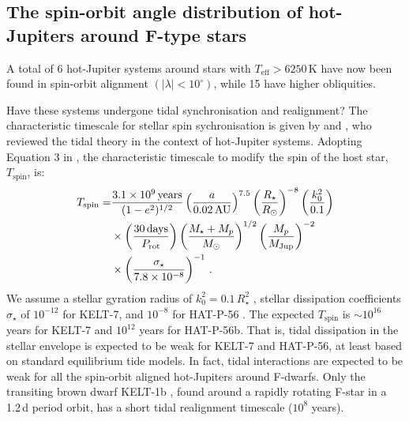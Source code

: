 \documentclass[useAMS,usenatbib]{mn2e}
\begin{document}
\subsection{The spin-orbit angle distribution of hot-Jupiters around F-type stars}
\label{sec:stats}

A total of 6 hot-Jupiter systems around stars with $T_\text{eff} > 6250\,\text{K}$ have now been found in spin-orbit alignment $(|\lambda| < 10^\circ)$, while 15 have higher obliquities.

Have these systems undergone tidal synchronisation and realignment? The characteristic timescale for stellar spin sychronisation is given by \citet{2010ApJ...723..285H} and \citet{2012ApJ...757....6H}, who reviewed the tidal theory in the context of hot-Jupiter systems. Adopting Equation 3 in \citet{2012ApJ...757....6H}, the characteristic timescale to modify the spin of the host star, $T_\text{spin}$, is:
\begin{align}
  T_\text{spin} =& \frac{3.1\times10^9\,\text{years}}{(1-e^2)^{1/2}} \left(\frac{a}{0.02 \,\text{AU}} \right)^{7.5} \left( \frac{R_\star}{R_\odot}\right)^{-8} \left( \frac{k_0^2}{0.1} \right) \notag\\
  &\times \left( \frac{30 \,\text{days}}{P_\text{rot}} \right) \left(\frac{M_\star + M_p}{M_\odot} \right)^{1/2} \left(\frac{M_p}{M_\text{Jup}} \right)^{-2} \notag\\
  &\times \left( \frac{\sigma_\star}{7.8\times10^{-8}} \right)^{-1}\,.
\end{align}
We assume a stellar gyration radius of $k_0^2=0.1\,R_\star ^2$ \citep{2000MNRAS.315..543H}, stellar dissipation coefficients $\sigma_\star$ of $10^{-12}$ for KELT-7, and $10^{-8}$ for  HAT-P-56 \citep[from Figure 3 of][]{2012ApJ...757....6H}. The expected $T_\text{spin}$ is $\sim 10^{16}$ years for KELT-7 and $10^{12}$ years for HAT-P-56b. That is, tidal dissipation in the stellar envelope is expected to be weak for KELT-7 and HAT-P-56, at least based on standard equilibrium tide models. In fact, tidal interactions are expected to be weak for all the spin-orbit aligned hot-Jupiters around F-dwarfs. Only the transiting brown dwarf KELT-1b \citep{2012ApJ...761..123S}, found around a rapidly rotating F-star in a 1.2\,d period orbit, has a short tidal realignment timescale ($10^8$ years). 
\end{document}
